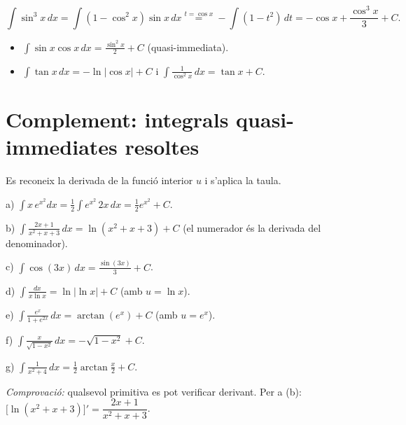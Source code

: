 \begin{equation*}
\int\sin^3x\,dx=\int(1-\cos^2x)\sin x\,dx\overset{t=\cos x}{=}-\int(1-t^2)\,dt=-\cos x+\frac{\cos^3x}{3}+C.
\end{equation*}

\begin{itemize}
\item $\displaystyle\int\sin x\cos x\,dx=\frac{\sin^2x}{2}+C$ (quasi-immediata).
\item $\displaystyle\int\tan x\,dx=-\ln|\cos x|+C$ i $\displaystyle\int\frac{1}{\cos^2x}\,dx=\tan x+C$.
\end{itemize}

\section{Complement: integrals quasi-immediates resoltes}

Es reconeix la derivada de la funció interior $u$ i s'aplica la taula.

a) $\displaystyle\int x\,e^{x^2}dx=\frac12\int e^{x^2}\,2x\,dx=\frac12e^{x^2}+C$.

b) $\displaystyle\int\frac{2x+1}{x^2+x+3}\,dx=\ln(x^2+x+3)+C$ (el numerador és la derivada del denominador).

c) $\displaystyle\int\cos(3x)\,dx=\frac{\sin(3x)}{3}+C$.

d) $\displaystyle\int\frac{dx}{x\ln x}=\ln|\ln x|+C$ (amb $u=\ln x$).

e) $\displaystyle\int\frac{e^{x}}{1+e^{2x}}\,dx=\arctan(e^{x})+C$ (amb $u=e^{x}$).

f) $\displaystyle\int\frac{x}{\sqrt{1-x^2}}\,dx=-\sqrt{1-x^2}+C$.

g) $\displaystyle\int\frac{1}{x^2+4}\,dx=\frac12\arctan\frac x2+C$.

\emph{Comprovació:} qualsevol primitiva es pot verificar derivant. Per a (b): $\bigl[\ln(x^2+x+3)\bigr]'=\dfrac{2x+1}{x^2+x+3}$.
